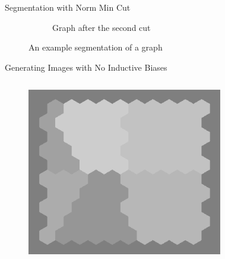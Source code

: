 \documentclass[10pt,xcolor=svgnames]{beamer} %
\begin{document}
\begin{frame}{Segmentation with Norm Min Cut}
\begin{figure}[ht!]
\begin{subfigure}{0.32\textwidth}
        \caption{Graph after the second cut}
        \end{subfigure}
    \caption{An example segmentation of a graph}
    \end{figure}
    
        
\end{frame}

\begin{frame}{Generating Images with No Inductive Biases}
    \begin{columns}
    \begin{figure}
        \centering
        \includegraphics[width=\textwidth]{pictures/grid_init2.png}        
    \end{figure}
    \vspace{-0.62cm}
    \begin{figure}
        \centering

\end{figure}
\end{columns}
\end{frame}
\end{document}

